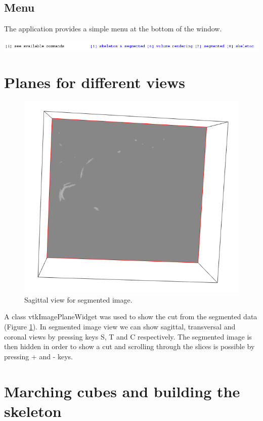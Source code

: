\subsection{Menu}
The application provides a simple menu at the bottom of the window.

\includegraphics[scale=0.4]{fig/menu}

\section{Planes for different views}

\begin{figure}
	\centering
	\includegraphics[scale=0.5]{fig/segmented-sagittal}
	\caption{Sagittal view for segmented image.}
	\label{fig:segmented-sagittal}
\end{figure}

A class vtkImagePlaneWidget was used to show the cut from the segmented data (Figure \ref{fig:segmented-sagittal}). In segmented image view we can show sagittal, transversal and coronal views by pressing keys S, T and C respectively. The segmented image is then hidden in order to show a cut and scrolling through the slices is possible by pressing + and - keys.

\section{Marching cubes and building the skeleton}



